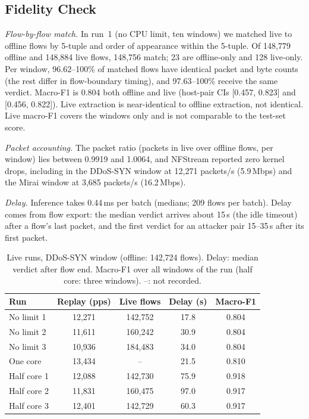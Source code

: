 \subsection{Fidelity Check}\label{sec:fidelity}

\emph{Flow-by-flow match.} In run~1 (no CPU limit, ten windows) we matched live to offline flows by 5-tuple and order of appearance within the 5-tuple. Of 148,779 offline and 148,884 live flows, 148,756 match; 23 are offline-only and 128 live-only. Per window, 96.62--100\% of matched flows have identical packet and byte counts (the rest differ in flow-boundary timing), and 97.63--100\% receive the same verdict. Macro-F1 is 0.804 both offline and live (host-pair CIs [0.457, 0.823] and [0.456, 0.822]). Live extraction is near-identical to offline extraction, not identical. Live macro-F1 covers the windows only and is not comparable to the test-set score.

\emph{Packet accounting.} The packet ratio (packets in live over offline flows, per window) lies between 0.9919 and 1.0064, and NFStream reported zero kernel drops, including in the DDoS-SYN window at 12,271 packets/s (5.9\,Mbps) and the Mirai window at 3,685 packets/s (16.2\,Mbps).

\emph{Delay.} Inference takes 0.44\,ms per batch (medians; 209 flows per batch). Delay comes from flow export: the median verdict arrives about 15\,s (the idle timeout) after a flow's last packet, and the first verdict for an attacker pair 15--35\,s after its first packet.

\begin{table}[t]
\centering
\caption{Live runs, DDoS-SYN window (offline: 142,724 flows). Delay: median verdict after flow end. Macro-F1 over all windows of the run (half core: three windows). --: not recorded.}
\label{tab:repeats}
\footnotesize
\setlength{\tabcolsep}{3pt}
\begin{tabular}{lcccc}
\hline
Run & Replay (pps) & Live flows & Delay (s) & Macro-F1 \\
\hline
No limit 1 & 12,271 & 142,752 & 17.8 & 0.804 \\
No limit 2 & 11,611 & 160,242 & 30.9 & 0.804 \\
No limit 3 & 10,936 & 184,483 & 34.0 & 0.804 \\
One core   & 13,434 & -- & 21.5 & 0.810 \\
Half core 1 & 12,088 & 142,730 & 75.9 & 0.918 \\
Half core 2 & 11,831 & 160,475 & 97.0 & 0.917 \\
Half core 3 & 12,401 & 142,729 & 60.3 & 0.917 \\
\hline
\end{tabular}
\end{table}

